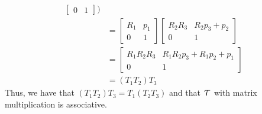\documentclass[11pt]{article}
\newcommand\Tau{\scalerel*{\tau}{T}}
\begin{document}
\begin{enumerate}[leftmargin=0.3in]
\begin{enumerate}
\begin{align*}
\begin{bmatrix}
              0 & 1
            \end{bmatrix} \bigg) \\
            &= \begin{bmatrix}
              \mathit{R}_1 & \mathit{p}_1 \\
              0 & 1
              \end{bmatrix} \begin{bmatrix}
                \mathit{R}_2 \mathit{R}_3 & \mathit{R}_2 \mathit{p}_3 + \mathit{p}_2 \\
                0 & 1
              \end{bmatrix} \\
            &= \begin{bmatrix}
                \mathit{R}_1 \mathit{R}_2 \mathit{R}_3 & \mathit{R}_1 \mathit{R}_2 \mathit{p}_3 + \mathit{R}_1 \mathit{p}_2 + \mathit{p}_1\\
                0 & 1
            \end{bmatrix} \\
            &= (\mathit{T}_1 \mathit{T}_2 ) \mathit{T}_3
       \end{align*}
Thus, we have that $(\mathit{T}_1 \mathit{T}_2) \mathit{T}_3  = \mathit{T}_1 (\mathit{T}_2 \mathit{T}_3)$ and that $\Tau$ with matrix multiplication is associative. \break


\end{enumerate}
\end{enumerate}
\end{document}
